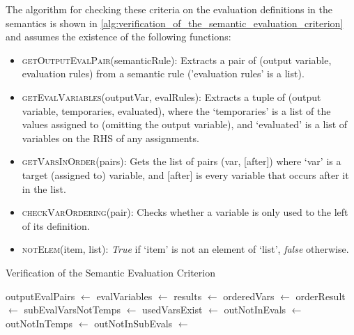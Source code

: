 The algorithm for checking these criteria on the evaluation definitions in the semantics is shown in \autoref{alg:verification_of_the_semantic_evaluation_criterion} and assumes the existence of the following functions:
\begin{itemize}
    \item \textsc{getOutputEvalPair}(semanticRule): Extracts a pair of (output variable, evaluation rules) from a semantic rule ('evaluation rules' is a list). 
    \item \textsc{getEvalVariables}(outputVar, evalRules): Extracts a tuple of (output variable, temporaries, evaluated), where the `temporaries' is a list of the values assigned to (omitting the output variable), and `evaluated' is a list of variables on the RHS of any assignments.
    \item \textsc{getVarsInOrder}(pairs): Gets the list of pairs (var, [after]) where `var' is a target (assigned to) variable, and [after] is every variable that occurs after it in the list.
    \item \textsc{checkVarOrdering}(pair): Checks whether a variable is only used to the left of its definition.
    \item \textsc{notElem}(item, list): \textit{True} if `item' is not an element of `list', \textit{false} otherwise. 
\end{itemize}

\begin{breakablealgorithm}
\caption{Verification of the Semantic Evaluation Criterion}
\label{alg:verification_of_the_semantic_evaluation_criterion}
\begin{algorithmic}
    \State outputEvalPairs $\gets$ 
    \State evalVariables $\gets$ 
    \State results $\gets$ 
    \State orderedVars $\gets$ 
    \State orderResult $\gets$ 
        \State {}
    \Else
        \State {}
    \EndIf
\EndFunction
\State
{}
    \State subEvalVarsNotTemps $\gets$ 
    \State usedVarsExist $\gets$ 
    \State outNotInEvals $\gets$ 
    \State outNotInTemps $\gets$ 
    \State outNotInSubEvals $\gets$ 
    \State {}
\EndFunction
\end{algorithmic}
\end{breakablealgorithm}

